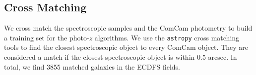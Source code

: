 \subsection{Cross Matching}

We cross match the spectroscopic samples and the ComCam photometry to build a training set for the photo-$z$ algorithms. We use the \texttt{astropy} cross matching tools to find the closest spectroscopic object to every ComCam object. They are considered a match if the closest spectroscopic object is within $0.5$ arcsec. In total, we find 3855 matched galaxies in the ECDFS fields. 
